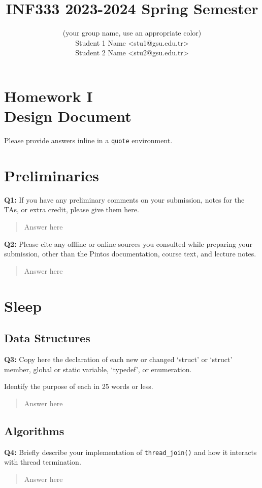 \documentclass[a4paper,11pt]{paper}
\title{INF333 2023-2024 Spring Semester}
\author{
\textbf{\color{blue}{Şirinler}} {\small(your group name, use an appropriate color)}
\\ Student 1 Name <stu1@gsu.edu.tr>
\\ Student 2 Name <stu2@gsu.edu.tr>}
\begin{document}
\maketitle

\section*{\LARGE Homework I \\
Design Document}

Please provide answers inline in a \texttt{quote} environment.


\section{Preliminaries}

\textbf{Q1:} If you have any preliminary comments on your submission, notes for the TAs, or extra credit, please give them here.
\begin{quote}
  Answer here
\end{quote}


\textbf{Q2:} Please cite any offline or online sources you consulted while preparing your
submission, other than the Pintos documentation, course text, and lecture notes.
\begin{quote}
  Answer here
\end{quote}


\section{Sleep}

\subsection{Data Structures}

\textbf{Q3:} Copy here the declaration of each new or changed `struct' or `struct' member, global or static variable, `typedef', or enumeration.

Identify the purpose of each in 25 words or less.
\begin{quote}
  Answer here
\end{quote}


\subsection{Algorithms}


\textbf{Q4:} Briefly describe your implementation of \texttt{thread\_join()} and how it interacts with thread termination.
\begin{quote}
  Answer here
\end{quote}
\end{document}

